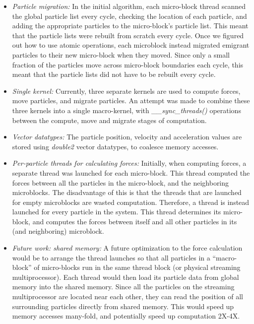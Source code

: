 \documentclass[11pt]{article} %
\begin{document}
\begin{itemize}
\item {\em Particle migration: } In the initial algorithm, each micro-block thread scanned the global particle list every cycle, checking the location of each particle, and adding the appropriate particles to the micro-block's particle list. This meant that the particle lists were rebuilt from scratch every cycle. Once we figured out how to use atomic operations, each microblock instead migrated emigrant particles to their new micro-block when they moved. Since only a small fraction of the particles move across micro-block boundaries each cycle, this meant that the particle lists did not have to be rebuilt every cycle.

\item {\em Single kernel: } Currently, three separate kernels are used to compute forces, move particles, and migrate particles. An attempt was made to combine these three kernels into a single macro-kernel, with {\em \_\_sync\_threads()} operations between the compute, move and migrate stages of computation.

\item {\em Vector datatypes: } The particle position, velocity and acceleration values are stored using {\em double2} vector datatypes, to coalesce memory accesses.

\item {\em Per-particle threads for calculating forces: } Initially, when computing forces, a separate thread was launched for each micro-block. This thread computed the forces between all the particles in the micro-block, and the neighboring microblocks. The disadvantage of this is that the threads that are launched for empty microblocks are wasted computation. Therefore, a thread is instead launched for every particle in the system. This thread determines its micro-block, and computes the forces between itself and all other particles in its (and neighboring) microblock.

\item {\em Future work: shared memory: } A future optimization to the force calculation would be to arrange the thread launches so that all particles in a ``macro-block'' of micro-blocks run in the same thread block (or physical streaming multiprocessor). Each thread would then load its particle data from global memory into the shared memory. Since all the particles on the streaming multiprocessor are located near each other, they can read the position of all surrounding particles directly from shared memory. This would speed up memory accesses many-fold, and potentially speed up computation 2X-4X.

\end{itemize}
\end{document}
